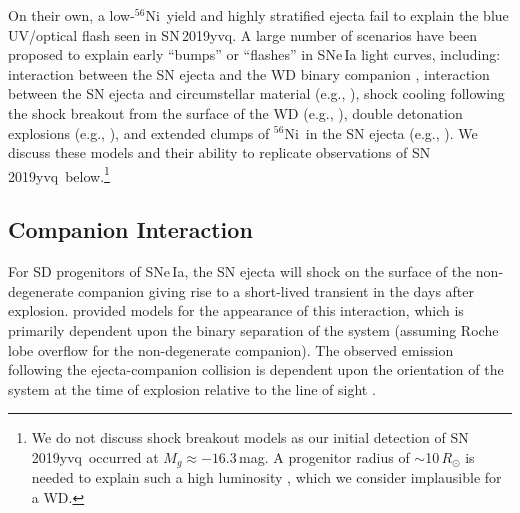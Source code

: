 \documentclass[twocolumn]{aastex63}
\newcommand{\radni}{$^{56}$Ni}
\newcommand{\sn}{SN\,2019yvq}
\begin{document}
On their own, a low-\radni\ yield and highly stratified ejecta fail to explain
the blue UV/optical flash seen in \sn. A large number of scenarios have been
proposed to explain early ``bumps'' or ``flashes'' in SNe\,Ia light curves,
including: interaction between the SN ejecta and the WD binary companion
\citep{Kasen10a}, interaction between the SN ejecta and circumstellar material
(e.g., \citealt{Dessart14,Piro16,Levanon17}), shock cooling following the
shock breakout from the surface of the WD (e.g., \citealt{Piro10,Rabinak11}),
double detonation explosions (e.g., \citealt{Noebauer17,Polin19}), and
extended clumps of \radni\ in the SN ejecta (e.g.,
\citealt{Shappee19,Dimitriadis19}). We discuss these models and their ability
to replicate observations of \sn\ below.\footnote{We do not discuss shock
breakout models as our initial detection of \sn\ occurred at $M_g \approx
-16.3$\,mag. A progenitor radius of $\sim$10$\,R_\odot$ is needed to explain
such a high luminosity \citep{Piro10,Rabinak11}, which we consider implausible
for a WD.}

\subsection{Companion Interaction}

For SD progenitors of SNe\,Ia, the SN ejecta will shock on the surface of the
non-degenerate companion giving rise to a short-lived transient in the days
after explosion. \citet{Kasen10a} provided models for the appearance of this
interaction, which is primarily dependent upon the binary separation of the
system (assuming Roche lobe overflow for the non-degenerate companion). The
observed emission following the ejecta-companion collision is dependent upon
the orientation of the system at the time of explosion relative to the line of
sight \citep{Kasen10a}.
\end{document}
